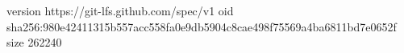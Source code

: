 version https://git-lfs.github.com/spec/v1
oid sha256:980e42411315b557acc558fa0e9db5904c8cae498f75569a4ba6811bd7e0652f
size 262240
